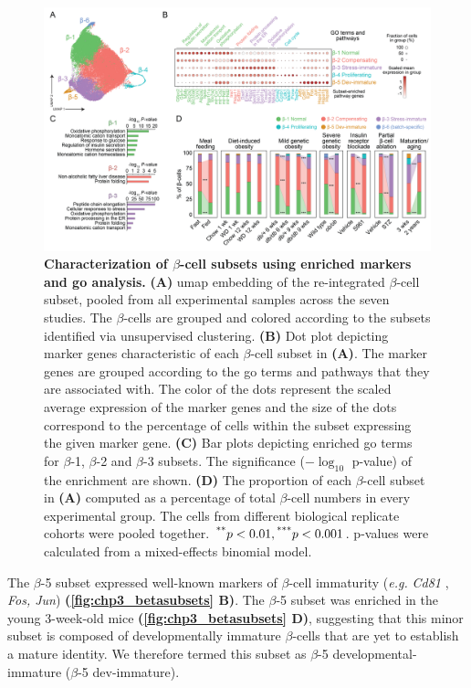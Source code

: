 \begin{figure}[t]
\centering
\includegraphics[width=\linewidth]{Chapter5/Fig/F3-1-v2-03.png}
\caption[Characterization of $\beta$-cell subsets using enriched markers and  analysis]{\textbf{Characterization of $\beta$-cell subsets using enriched markers and \gls{go} analysis.} \textbf{(A)} \gls{umap} embedding of the re-integrated $\beta$-cell subset, pooled from all experimental samples across the seven studies. The $\beta$-cells are grouped and colored according to the subsets identified via unsupervised clustering. \textbf{(B)} Dot plot depicting marker genes characteristic of each $\beta$-cell subset in \textbf{(A)}. The marker genes are grouped according to the \gls{go} terms and pathways that they are associated with. The color of the dots represent the scaled average expression of the marker genes and the size of the dots correspond to the percentage of cells within the subset expressing the given marker gene. \textbf{(C)} Bar plots depicting enriched \gls{go} terms for $\beta$-1, $\beta$-2 and $\beta$-3 subsets. The significance ($-\log_{10}$ p-value) of the enrichment are shown. \textbf{(D)} The proportion of each $\beta$-cell subset in \textbf{(A)} computed as a percentage of total $\beta$-cell numbers in every experimental group. The cells from different biological replicate cohorts were pooled together. $\textsuperscript{**} p < 0.01, \textsuperscript{***} p < 0.001$. p-values were calculated from a mixed-effects binomial model.}
\label{fig:chp3_betasubsets}
\end{figure}

\par The $\beta$-5 subset expressed well-known markers of $\beta$-cell immaturity (\textit{e.g.} \textit{Cd81} \textbf{\cite{salinno_cd81_2021}}, \textit{Fos, Jun}) \textbf{(\autoref{fig:chp3_betasubsets} B)}. The $\beta$-5 subset was enriched in the young 3-week-old mice \textbf{(\autoref{fig:chp3_betasubsets} D)}, suggesting that this minor subset is composed of developmentally immature $\beta$-cells that are yet to establish a mature identity. We therefore termed this subset as $\beta$-5 developmental-immature ($\beta$-5 dev-immature).\\


